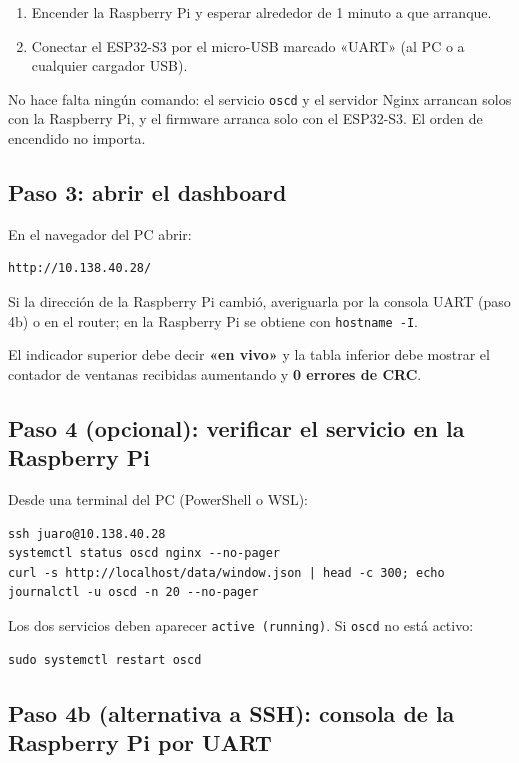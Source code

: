 \documentclass[12pt,a4paper]{article}
\begin{document}
\begin{enumerate}
  \item Encender la Raspberry Pi y esperar alrededor de 1 minuto a que arranque.
  \item Conectar el ESP32-S3 por el micro-USB marcado «UART» (al PC o a cualquier cargador USB).
\end{enumerate}

No hace falta ningún comando: el servicio \texttt{oscd} y el servidor Nginx arrancan solos con la Raspberry Pi, y el firmware arranca solo con el ESP32-S3. El orden de encendido no importa.

\subsection{Paso 3: abrir el dashboard}

En el navegador del PC abrir:

\begin{verbatim}
http://10.138.40.28/
\end{verbatim}

Si la dirección de la Raspberry Pi cambió, averiguarla por la consola UART (paso 4b) o en el router; en la Raspberry Pi se obtiene con \texttt{hostname -I}.

El indicador superior debe decir \textbf{«en vivo»} y la tabla inferior debe mostrar el contador de ventanas recibidas aumentando y \textbf{0 errores de CRC}.

\subsection{Paso 4 (opcional): verificar el servicio en la Raspberry Pi}

Desde una terminal del PC (PowerShell o WSL):

\begin{verbatim}
ssh juaro@10.138.40.28
systemctl status oscd nginx --no-pager
curl -s http://localhost/data/window.json | head -c 300; echo
journalctl -u oscd -n 20 --no-pager
\end{verbatim}

Los dos servicios deben aparecer \texttt{active (running)}. Si \texttt{oscd} no está activo:

\begin{verbatim}
sudo systemctl restart oscd
\end{verbatim}

\subsection{Paso 4b (alternativa a SSH): consola de la Raspberry Pi por UART}
\end{document}
